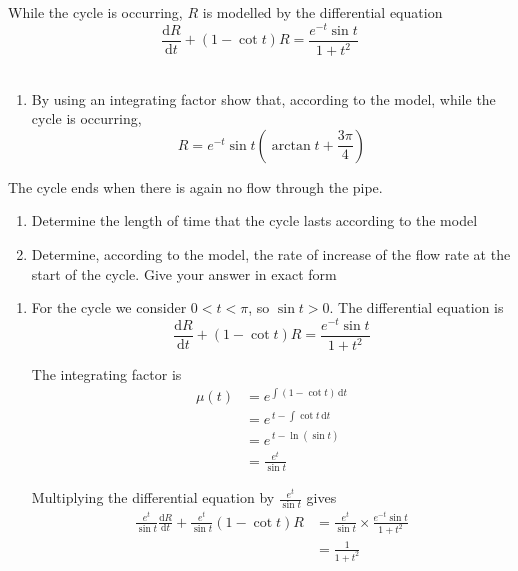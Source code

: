\documentclass[leqno]{article}
\begin{document}
\begin{enumerate}[
  label=\textbf{\arabic*.},
  leftmargin=*,
  topsep=0pt,
  partopsep=0pt,
  parsep=0pt
]
While the cycle is occurring, $R$ is modelled by the differential equation
\[
\frac{\mathrm{d}R}{\mathrm{d}t}+(1-\cot t)R=\frac{e^{-t}\sin t}{1+t^2}
\]\\
\begin{enumerate}[label=\textbf{(\alph*)}]
  \item By using an integrating factor show that, according to the model, while the cycle is occurring,
  \[
  R=e^{-t}\sin t\left(\arctan t+\frac{3\pi}{4}\right)
  \] 
\end{enumerate}
The cycle ends when there is again no flow through the pipe. \\
\begin{enumerate}[label=\textbf{(\alph*)}, resume]
  \item Determine the length of time that the cycle lasts according to the model  \\
  \item Determine, according to the model, the rate of increase of the flow rate at the start of the cycle. Give your answer in exact form  \\
\end{enumerate}

\vspace*{10pt}

\begin{djsSolution}
\begin{enumerate}[label=\textbf{(\alph*)}]
  \item For the cycle we consider \(0<t<\pi\), so \(\sin t>0\).  
  The differential equation is
  \[
  \frac{\mathrm{d}R}{\mathrm{d}t}+(1-\cot t)R=\frac{e^{-t}\sin t}{1+t^2}
  \]

  The integrating factor is
  \begin{align*}
  \mu(t)
  &= e^{\int(1-\cot t)\,\mathrm{d}t} \\
  &= e^{\,t-\int \cot t\,\mathrm{d}t} \\
  &= e^{\,t-\ln(\sin t)} \\
  &= \frac{e^t}{\sin t}
  \end{align*}

  Multiplying the differential equation by \(\frac{e^t}{\sin t}\) gives
  \begin{align*}
  \frac{e^t}{\sin t}\frac{\mathrm{d}R}{\mathrm{d}t}
  +\frac{e^t}{\sin t}(1-\cot t)R
  &= \frac{e^t}{\sin t}\times\frac{e^{-t}\sin t}{1+t^2} \\
  &= \frac{1}{1+t^2}
  \end{align*}


\end{enumerate}
\end{djsSolution}
\end{enumerate}
\end{document}
